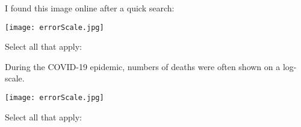 \documentclass[nooutcomes,noauthor]{ximera}
\author{Bart Snapp}
\begin{document}
\maketitle
\begin{exercise}
I found this image online after a quick search:
    \begin{center}
        \texttt{[image: errorScale.jpg]}
    \end{center}
    Select all that apply:
\end{exercise}


\begin{exercise}
During the COVID-19 epidemic, numbers of deaths were often shown on a log-scale.
        \begin{center}
            \texttt{[image: errorScale.jpg]}
        \end{center}
        Select all that apply:
    \end{exercise}




\end{document}
